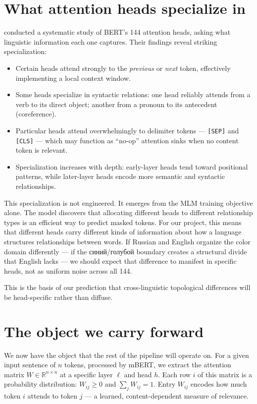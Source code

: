 \section{What attention heads specialize in}

\textcite{clark2019} conducted a systematic study of BERT's 144 attention heads, asking what linguistic information each one captures. Their findings reveal striking specialization:

\begin{itemize}
  \item Certain heads attend strongly to the \emph{previous} or \emph{next} token, effectively implementing a local context window.
  \item Some heads specialize in syntactic relations: one head reliably attends from a verb to its direct object; another from a pronoun to its antecedent (coreference).
  \item Particular heads attend overwhelmingly to delimiter tokens --- \texttt{[SEP]} and \texttt{[CLS]} --- which may function as ``no-op'' attention sinks when no content token is relevant.
  \item Specialization increases with depth: early-layer heads tend toward positional patterns, while later-layer heads encode more semantic and syntactic relationships.
\end{itemize}

This specialization is not engineered. It emerges from the MLM training objective alone. The model discovers that allocating different heads to different relationship types is an efficient way to predict masked tokens. For our project, this means that different heads carry different kinds of information about how a language structures relationships between words. If Russian and English organize the color domain differently --- if the синий/голубой boundary creates a structural divide that English lacks --- we should expect that difference to manifest in specific heads, not as uniform noise across all 144.

This is the basis of our prediction that cross-linguistic topological differences will be head-specific rather than diffuse.

\section{The object we carry forward}

We now have the object that the rest of the pipeline will operate on. For a given input sentence of $n$ tokens, processed by mBERT, we extract the attention matrix $W \in \mathbb{R}^{n \times n}$ at a specific layer $\ell$ and head $h$. Each row $i$ of this matrix is a probability distribution: $W_{ij} \geq 0$ and $\sum_j W_{ij} = 1$. Entry $W_{ij}$ encodes how much token $i$ attends to token $j$ --- a learned, content-dependent measure of relevance.

